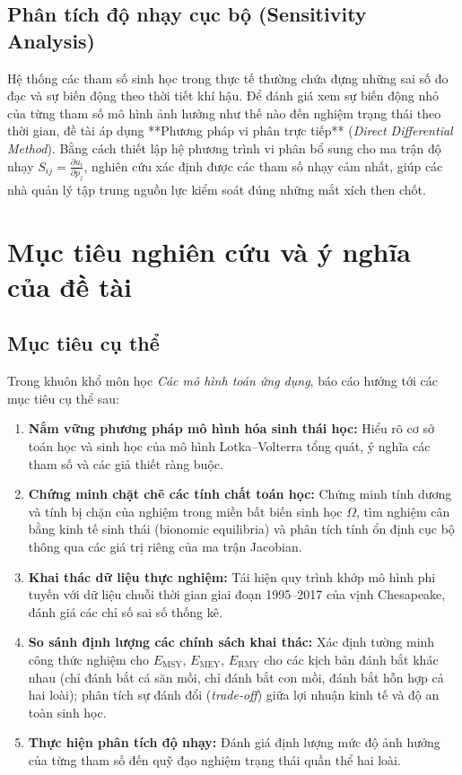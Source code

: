 \subsection{Phân tích độ nhạy cục bộ (Sensitivity Analysis)}
Hệ thống các tham số sinh học trong thực tế thường chứa đựng những sai số đo đạc và sự biến động theo thời tiết khí hậu. Để đánh giá xem sự biến động nhỏ của từng tham số mô hình ảnh hưởng như thế nào đến nghiệm trạng thái theo thời gian, đề tài áp dụng **Phương pháp vi phân trực tiếp** (\textit{Direct Differential Method}). Bằng cách thiết lập hệ phương trình vi phân bổ sung cho ma trận độ nhạy $S_{ij} = \frac{\partial u_i}{\partial p_j}$, nghiên cứu xác định được các tham số nhạy cảm nhất, giúp các nhà quản lý tập trung nguồn lực kiểm soát đúng những mắt xích then chốt.

\section{Mục tiêu nghiên cứu và ý nghĩa của đề tài}
\label{sec:intro_objectives}

\subsection{Mục tiêu cụ thể}
Trong khuôn khổ môn học \textit{Các mô hình toán ứng dụng}, báo cáo hướng tới các mục tiêu cụ thể sau:
\begin{enumerate}
    \item \textbf{Nắm vững phương pháp mô hình hóa sinh thái học:} Hiểu rõ cơ sở toán học và sinh học của mô hình Lotka--Volterra tổng quát, ý nghĩa các tham số và các giả thiết ràng buộc.
    \item \textbf{Chứng minh chặt chẽ các tính chất toán học:} Chứng minh tính dương và tính bị chặn của nghiệm trong miền bất biến sinh học $\Omega$, tìm nghiệm cân bằng kinh tế sinh thái (bionomic equilibria) và phân tích tính ổn định cục bộ thông qua các giá trị riêng của ma trận Jacobian.
    \item \textbf{Khai thác dữ liệu thực nghiệm:} Tái hiện quy trình khớp mô hình phi tuyến với dữ liệu chuỗi thời gian giai đoạn 1995--2017 của vịnh Chesapeake, đánh giá các chỉ số sai số thống kê.
    \item \textbf{So sánh định lượng các chính sách khai thác:} Xác định tường minh công thức nghiệm cho $E_{\mathrm{MSY}}$, $E_{\mathrm{MEY}}$, $E_{\mathrm{RMY}}$ cho các kịch bản đánh bắt khác nhau (chỉ đánh bắt cá săn mồi, chỉ đánh bắt con mồi, đánh bắt hỗn hợp cả hai loài); phân tích sự đánh đổi (\textit{trade-off}) giữa lợi nhuận kinh tế và độ an toàn sinh học.
    \item \textbf{Thực hiện phân tích độ nhạy:} Đánh giá định lượng mức độ ảnh hưởng của từng tham số đến quỹ đạo nghiệm trạng thái quần thể hai loài.
\end{enumerate}

